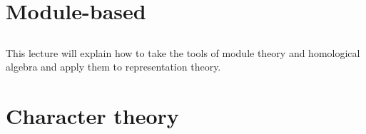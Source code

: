 \documentclass[twoside,11pt,reqno]{amsart}
\begin{document}
\section{Module-based}
\label{sec:module-based}

\subsection{}

This lecture will explain how to take the tools of module theory and homological algebra and apply them to representation theory. 



\section{Character theory}
\label{sec:character-theory}




{}

\end{document}

